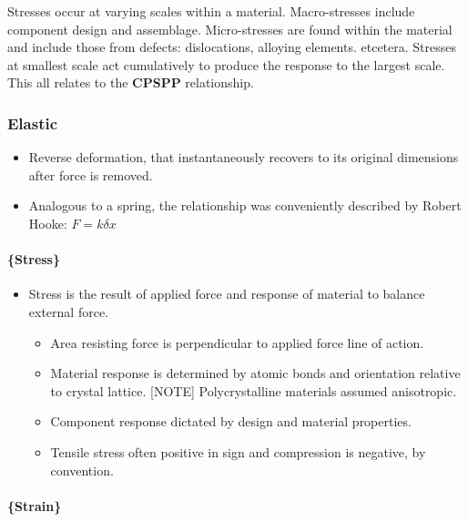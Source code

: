 \documentclass[
]{article}
\providecommand{\tightlist}{%
  \setlength{\itemsep}{0pt}\setlength{\parskip}{0pt}}
\begin{document}
Stresses occur at varying scales within a material. Macro-stresses
include component design and assemblage. Micro-stresses are found within
the material and include those from defects: dislocations, alloying
elements. etcetera. Stresses at smallest scale act cumulatively to
produce the response to the largest scale. This all relates to the
\textbf{CPSPP} relationship.

\hypertarget{elastic}{%
\subsubsection{Elastic}\label{elastic}}

\begin{itemize}
\tightlist
\item
  Reverse deformation, that instantaneously recovers to its original
  dimensions after force is removed.
\item
  Analogous to a spring, the relationship was conveniently described by
  Robert Hooke: \(F = k\delta x\)
\end{itemize}

\hypertarget{stress}{%
\paragraph{\{Stress\}}\label{stress}}

\begin{itemize}
\tightlist
\item
  Stress is the result of applied force and response of material to
  balance external force.

  \begin{itemize}
  \tightlist
  \item
    Area resisting force is perpendicular to applied force line of
    action.
  \item
    Material response is determined by atomic bonds and orientation
    relative to crystal lattice. {[}NOTE{]} Polycrystalline materials
    assumed anisotropic.
  \item
    Component response dictated by design and material properties.
  \item
    Tensile stress often positive in sign and compression is negative,
    by convention.
  \end{itemize}
\end{itemize}

\hypertarget{strain}{%
\paragraph{\{Strain\}}\label{strain}}
\end{document}

